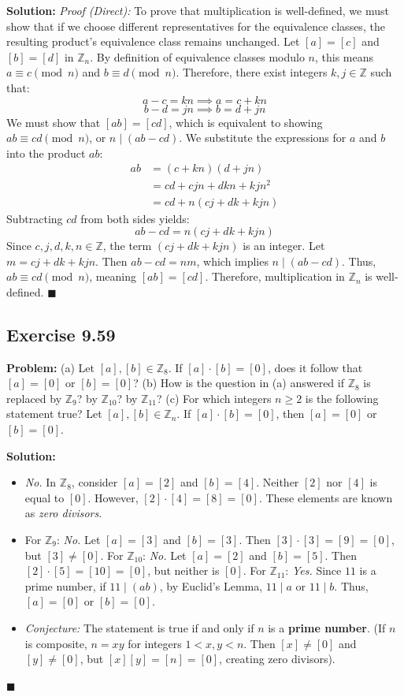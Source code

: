\documentclass[11pt, a4paper]{article}
\theoremstyle{definition}
\theoremstyle{remark}
\newcommand{\Z}{\mathbb{Z}}
\begin{document}
\textbf{Solution:}
\textit{Proof (Direct):} To prove that multiplication is well-defined, we must show that if we choose different representatives for the equivalence classes, the resulting product's equivalence class remains unchanged. 
Let $[a] = [c]$ and $[b] = [d]$ in $\Z_n$. By definition of equivalence classes modulo $n$, this means $a \equiv c \pmod n$ and $b \equiv d \pmod n$. 
Therefore, there exist integers $k, j \in \Z$ such that:
\[
a - c = kn \implies a = c + kn
\]
\[
b - d = jn \implies b = d + jn
\]
We must show that $[ab] = [cd]$, which is equivalent to showing $ab \equiv cd \pmod n$, or $n \mid (ab - cd)$.
We substitute the expressions for $a$ and $b$ into the product $ab$:
\begin{align*}
ab &= (c + kn)(d + jn) \\
   &= cd + cjn + dkn + kjn^2 \\
   &= cd + n(cj + dk + kjn)
\end{align*}
Subtracting $cd$ from both sides yields:
\[
ab - cd = n(cj + dk + kjn)
\]
Since $c, j, d, k, n \in \Z$, the term $(cj + dk + kjn)$ is an integer. Let $m = cj + dk + kjn$. Then $ab - cd = nm$, which implies $n \mid (ab - cd)$. Thus, $ab \equiv cd \pmod n$, meaning $[ab] = [cd]$. Therefore, multiplication in $\Z_n$ is well-defined.
\hfill $\blacksquare$

\subsection{Exercise 9.59}
\textbf{Problem:} 
(a) Let $[a], [b] \in \Z_8$. If $[a] \cdot [b] = [0]$, does it follow that $[a] = [0]$ or $[b] = [0]$?
(b) How is the question in (a) answered if $\Z_8$ is replaced by $\Z_9$? by $\Z_{10}$? by $\Z_{11}$?
(c) For which integers $n \ge 2$ is the following statement true? Let $[a], [b] \in \Z_n$. If $[a] \cdot [b] = [0]$, then $[a] = [0]$ or $[b] = [0]$.

\textbf{Solution:}
\begin{itemize}
    \item[(a)] \textit{No.} In $\Z_8$, consider $[a] = [2]$ and $[b] = [4]$. Neither $[2]$ nor $[4]$ is equal to $[0]$. However, $[2] \cdot [4] = [8] = [0]$. These elements are known as \textit{zero divisors}.
    \item[(b)] 
    For $\Z_9$: \textit{No.} Let $[a] = [3]$ and $[b] = [3]$. Then $[3] \cdot [3] = [9] = [0]$, but $[3] \neq [0]$.
    For $\Z_{10}$: \textit{No.} Let $[a] = [2]$ and $[b] = [5]$. Then $[2] \cdot [5] = [10] = [0]$, but neither is $[0]$.
    For $\Z_{11}$: \textit{Yes.} Since $11$ is a prime number, if $11 \mid (ab)$, by Euclid's Lemma, $11 \mid a$ or $11 \mid b$. Thus, $[a] = [0]$ or $[b] = [0]$.
    \item[(c)] \textit{Conjecture:} The statement is true if and only if $n$ is a \textbf{prime number}. (If $n$ is composite, $n = xy$ for integers $1 < x, y < n$. Then $[x] \neq [0]$ and $[y] \neq [0]$, but $[x][y] = [n] = [0]$, creating zero divisors).
\end{itemize}
\hfill $\blacksquare$
\end{document}
